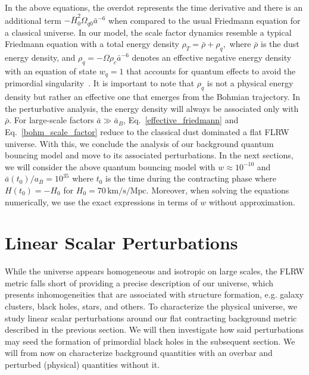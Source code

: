 \documentclass[a4paper,11pt]{article}
\begin{document}
In the above equations, the overdot represents the time derivative and there is an
additional term $-\bar{H}^{2}_{0}\Omega_{q0}\bar{a}^{-6}$ when compared to the usual
Friedmann equation for a classical universe. In our model, the scale factor dynamics
resemble a typical Friedmann equation with a total energy density $\rho_{T} = \bar{\rho}
	+ \rho_{q},$ where $\bar{\rho}$ is the dust energy density, and $\rho_{q} = -\Omega
	\rho_{c} \bar{a}^{-6}$ denotes an effective negative energy density with an equation of
state $w_q = 1$ that accounts for quantum effects to avoid the primordial
singularity~\cite{vitenti2012large}. It is important to note that $\rho_{q}$ is not a
physical energy density but rather an effective one that emerges from the Bohmian
trajectory. In the perturbative analysis, the energy density will always be associated
only with $\bar{\rho}$. For large-scale factors $\bar{a} \gg \bar{a}_{B} $,
Eq.~\eqref{effective_friedmann} and Eq.~\eqref{bohm_scale_factor} reduce to the
classical dust dominated a flat FLRW universe. With this, we conclude the analysis of
our background quantum bouncing model and move to its associated perturbations. In the
next sections, we will consider the above quantum bouncing model with $w\approx
	10^{-10}$ and $\bar{a}(t_0)/a_B = 10^{35}$ where $t_0$ is the time during the
contracting phase where $H(t_0) = -H_0$ for $H_0 = 70 \, \text{km/s/Mpc}$. Moreover,
when solving the equations numerically, we use the exact expressions in terms of $w$
without approximation.



\section{Linear Scalar Perturbations}
\label{linearpert}

While the universe appears homogeneous and isotropic on large scales, the FLRW metric
falls short of providing a precise description of our universe, which presents
inhomogeneities that are associated with structure formation, e.g. galaxy clusters,
black holes, stars, and others. To characterize the physical universe, we study linear
scalar perturbations around our flat contracting background metric described in the
previous section. We will then investigate how said perturbations may seed the formation
of primordial black holes in the subsequent section. We will from now on characterize
background quantities with an overbar and perturbed (physical) quantities without it.
\end{document}
